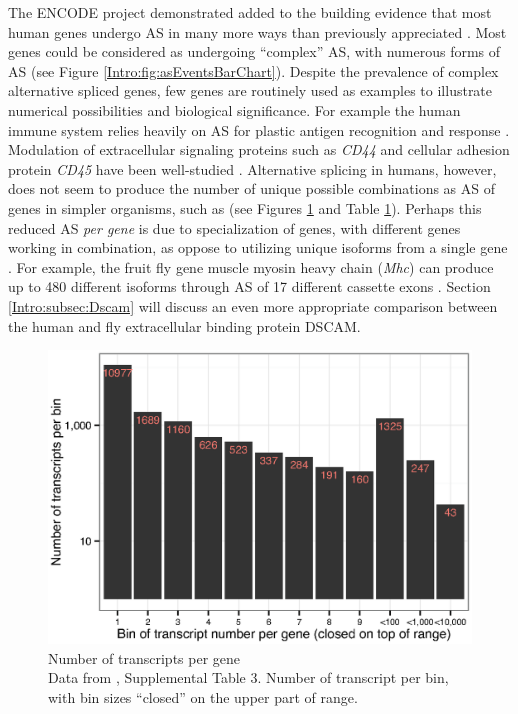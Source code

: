     The ENCODE project demonstrated added to the building evidence that most human genes undergo AS in many more ways than previously appreciated \citep{Wang2008,Pan2008}. Most genes could be considered as undergoing ``complex'' AS, with numerous forms of AS (see Figure \ref{Intro:fig:asEventsBarChart}). Despite the prevalence of complex alternative spliced genes, few genes are routinely used as examples to illustrate numerical possibilities and biological significance. For example the human immune system relies heavily on AS for plastic antigen recognition and response \citep{Lynch2004}. Modulation of extracellular signaling proteins such as \textit{CD44} and cellular adhesion protein \textit{CD45} have been well-studied \citep{Zikherman2008,Ponta2003}. Alternative splicing in humans, however, does not seem to produce the number of unique possible combinations as AS of genes in simpler organisms, such as \flies{} (see Figures \ref{Intro:fig:txPerFlyGene} and Table \ref{Intro:fig:txPerFlyGene}). Perhaps this reduced AS \textit{per gene} is due to specialization of genes, with different genes working in combination, as oppose to utilizing unique isoforms from a single gene \citep{Park2007}. For example, the fruit fly gene muscle myosin heavy chain (\textit{Mhc}) can produce up to 480 different isoforms through AS of 17 different cassette exons \citep{Bernstein1983a}. Section \ref{Intro:subsec:Dscam} will discuss an even more appropriate comparison between the human and fly extracellular binding protein DSCAM.

    \begin{figure} %
      \centering 
      \includegraphics{Figures/Intro/NumberOFTranscriptsPerFlyGene.eps}
      \caption[Number of transcripts per \flies{} gene]
      {
        Number of transcripts per \flies{} gene\\[0.25cm]
        Data from \citep{Brown2014}, Supplemental Table 3. Number of transcript per bin, with bin sizes ``closed'' on the upper part of range.
        }
      \label{Intro:fig:txPerFlyGene}
      \end{figure}

